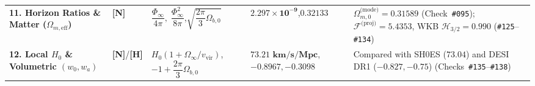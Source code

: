 \documentclass[11pt,a4paper]{article}
\newcommand{\catH}{\textbf{\textcolor{orange!85!black}{[H]}}}
\newcommand{\catN}{\textbf{\textcolor{teal!75!black}{[N]}}}
\theoremstyle{plain}
\theoremstyle{definition}
\theoremstyle{remark}
\numberwithin{equation}{section}
\begin{document}
\begin{table}[H]
\begin{tabularx}{\textwidth}{@{} L{0.20\textwidth} C{0.11\textwidth} C{0.22\textwidth} C{0.18\textwidth} Y @{}}
\addlinespace[2.5pt]
\textbf{11. Horizon Ratios \& Matter ($\Omega_{m,\text{eff}}$)} & \catN & $\dfrac{\Phi_{\infty}}{4\pi}, \;\dfrac{\Phi_{\infty}^2}{8\pi}$,\newline$\sqrt{\dfrac{2\pi}{3}\Omega_{b,0}}$ & $\mathbf{2.297 \times 10^{-9}}$,\newline$\mathbf{0.32133}$ & $\Omega_{m,0}^{\text{(mode)}} = 0.31589$ (Check~\texttt{\#095}); $\mathcal{F}^{\text{(proj)}} = 5.4353$, WKB $\mathcal{H}_{3/2} = 0.990$ (\texttt{\#125}--\texttt{\#134}) \\
\addlinespace[2.5pt]
\textbf{12. Local $H_0$ \& Volumetric $(w_0, w_a)$} & \catN/\catH & $H_0(1+\Omega_{\infty}/v_{\text{vir}})$,\newline$-1 + \dfrac{2\pi}{3}\Omega_{b,0}$ & $\mathbf{73.21\text{ km/s/Mpc}}$,\newline$\mathbf{-0.8967, -0.3098}$ & Compared with SH0ES ($73.04$) and DESI DR1 ($-0.827, -0.75$) (Checks~\texttt{\#135}--\texttt{\#138}) \\
\bottomrule
\end{tabularx}
\end{table}
\end{document}
